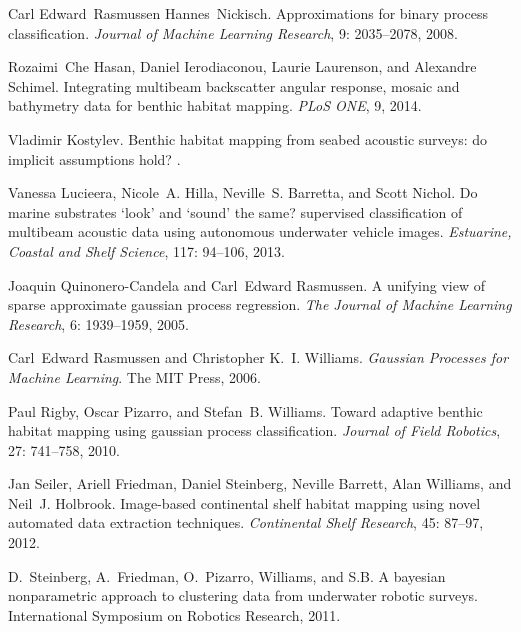 \documentclass[journal]{IEEEtran}
\begin{document}
\begin{thebibliography}{13}
Carl Edward~Rasmussen Hannes~Nickisch.
\newblock Approximations for binary process classification.
\newblock \emph{Journal of Machine Learning Research}, 9: 2035--2078,
  2008.

Rozaimi~Che Hasan, Daniel Ierodiaconou, Laurie Laurenson, and Alexandre
  Schimel.
\newblock Integrating multibeam backscatter angular response, mosaic and
  bathymetry data for benthic habitat mapping.
\newblock \emph{PLoS ONE}, 9, 2014.

Vladimir Kostylev.
\newblock Benthic habitat mapping from seabed acoustic surveys: do implicit
  assumptions hold?
.

Vanessa Lucieera, Nicole~A. Hilla, Neville~S. Barretta, and Scott Nichol.
\newblock Do marine substrates ‘look’ and ‘sound’ the same? supervised
  classification of multibeam acoustic data using autonomous underwater vehicle
  images.
\newblock \emph{Estuarine, Coastal and Shelf Science}, 117: 94--106,
  2013.

Joaquin Quinonero-Candela and Carl~Edward Rasmussen.
\newblock A unifying view of sparse approximate gaussian process regression.
\newblock \emph{The Journal of Machine Learning Research}, 6:
  1939--1959, 2005.

Carl~Edward Rasmussen and Christopher K.~I. Williams.
\newblock \emph{Gaussian Processes for Machine Learning}.
\newblock The MIT Press, 2006.

Paul Rigby, Oscar Pizarro, and Stefan~B. Williams.
\newblock Toward adaptive benthic habitat mapping using gaussian process
  classification.
\newblock \emph{Journal of Field Robotics}, 27: 741--758, 2010.

Jan Seiler, Ariell Friedman, Daniel Steinberg, Neville Barrett, Alan Williams,
  and Neil~J. Holbrook.
\newblock Image-based continental shelf habitat mapping using novel automated
  data extraction techniques.
\newblock \emph{Continental Shelf Research}, 45: 87--97, 2012.

D.~Steinberg, A.~Friedman, O.~Pizarro, Williams, and S.B.
\newblock A bayesian nonparametric approach to clustering data from underwater
  robotic surveys.
\newblock International Symposium on Robotics Research, 2011.

\end{thebibliography}
\end{document}
